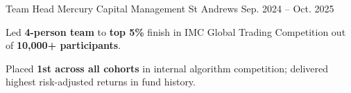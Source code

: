 

\begin{cventries}

  \cventry
    {Team Head} %
    {Mercury Capital Management} %
    {St Andrews} %
    {Sep. 2024 -- Oct. 2025} %
    {
      \begin{cvitems}
        \item {Led \textbf{4-person team} to \textbf{top 5\%} finish in IMC Global Trading Competition out of \textbf{10,000+ participants}.}
        \item {Placed \textbf{1st across all cohorts} in internal algorithm competition; delivered highest risk-adjusted returns in fund history.}
      \end{cvitems}
    }
\end{cventries}
